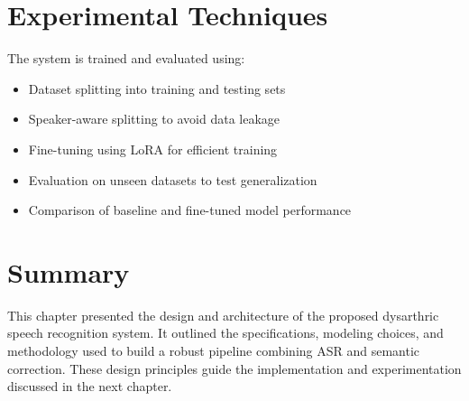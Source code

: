 



\section{Experimental Techniques}

The system is trained and evaluated using:
\begin{itemize}
\item Dataset splitting into training and testing sets
\item Speaker-aware splitting to avoid data leakage
\item Fine-tuning using LoRA for efficient training
\item Evaluation on unseen datasets to test generalization
\item Comparison of baseline and fine-tuned model performance
\end{itemize}

\section{Summary}

This chapter presented the design and architecture of the proposed dysarthric speech recognition system. It outlined the specifications, modeling choices, and methodology used to build a robust pipeline combining ASR and semantic correction. These design principles guide the implementation and experimentation discussed in the next chapter.